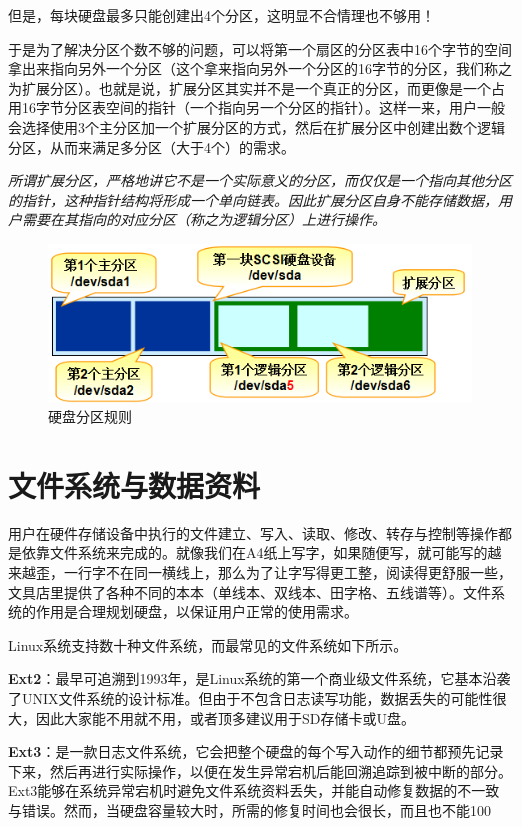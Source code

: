 \documentclass[UTF8]{article}
\begin{document}
	但是，每块硬盘最多只能创建出4个分区，这明显不合情理也不够用！
	
	于是为了解决分区个数不够的问题，可以将第一个扇区的分区表中16个字节的空间拿出来指向另外一个分区（这个拿来指向另外一个分区的16字节的分区，我们称之为扩展分区）。也就是说，扩展分区其实并不是一个真正的分区，而更像是一个占用16字节分区表空间的指针（一个指向另一个分区的指针）。这样一来，用户一般会选择使用3个主分区加一个扩展分区的方式，然后在扩展分区中创建出数个逻辑分区，从而来满足多分区（大于4个）的需求。
	
	\emph{所谓扩展分区，严格地讲它不是一个实际意义的分区，而仅仅是一个指向其他分区的指针，这种指针结构将形成一个单向链表。因此扩展分区自身不能存储数据，用户需要在其指向的对应分区（称之为逻辑分区）上进行操作。}
	
	\begin{figure}[H]
		\centering
		\includegraphics{Hard_disk_partitioning_rules.png}
		\caption{硬盘分区规则}
	\end{figure}
	
	
	\section{文件系统与数据资料}
	
	用户在硬件存储设备中执行的文件建立、写入、读取、修改、转存与控制等操作都是依靠文件系统来完成的。就像我们在A4纸上写字，如果随便写，就可能写的越来越歪，一行字不在同一横线上，那么为了让字写得更工整，阅读得更舒服一些，文具店里提供了各种不同的本本（单线本、双线本、田字格、五线谱等）。文件系统的作用是合理规划硬盘，以保证用户正常的使用需求。
	
	Linux系统支持数十种文件系统，而最常见的文件系统如下所示。
	
	\textbf{Ext2}：最早可追溯到1993年，是Linux系统的第一个商业级文件系统，它基本沿袭了UNIX文件系统的设计标准。但由于不包含日志读写功能，数据丢失的可能性很大，因此大家能不用就不用，或者顶多建议用于SD存储卡或U盘。
	
	\textbf{Ext3}：是一款日志文件系统，它会把整个硬盘的每个写入动作的细节都预先记录下来，然后再进行实际操作，以便在发生异常宕机后能回溯追踪到被中断的部分。Ext3能够在系统异常宕机时避免文件系统资料丢失，并能自动修复数据的不一致与错误。然而，当硬盘容量较大时，所需的修复时间也会很长，而且也不能100%
	
\end{document}

